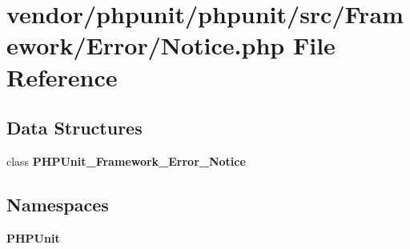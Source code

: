 \section{vendor/phpunit/phpunit/src/\+Framework/\+Error/\+Notice.php File Reference}
\label{_notice_8php}
\subsection*{Data Structures}
\begin{DoxyCompactItemize}
\item 
class {\bf P\+H\+P\+Unit\+\_\+\+Framework\+\_\+\+Error\+\_\+\+Notice}
\end{DoxyCompactItemize}
\subsection*{Namespaces}
\begin{DoxyCompactItemize}
\item 
 {\bf P\+H\+P\+Unit}
\end{DoxyCompactItemize}
